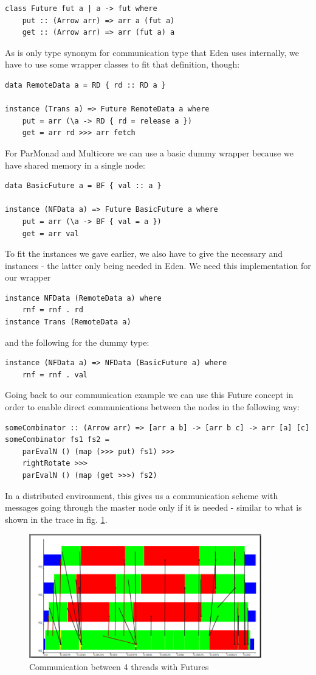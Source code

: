 \begin{lstlisting}[frame=htrbl]
class Future fut a | a -> fut where
    put :: (Arrow arr) => arr a (fut a)
    get :: (Arrow arr) => arr (fut a) a
\end{lstlisting}
As  is only type synonym for communication type that Eden uses internally, we have to use some wrapper classes to fit that definition, though:
\begin{lstlisting}[frame=htrbl]
data RemoteData a = RD { rd :: RD a }

instance (Trans a) => Future RemoteData a where
    put = arr (\a -> RD { rd = release a })
    get = arr rd >>> arr fetch
\end{lstlisting}
For ParMonad and Multicore we can use a basic dummy wrapper because we have shared memory in a single node:
\begin{lstlisting}[frame=htrbl]
data BasicFuture a = BF { val :: a }

instance (NFData a) => Future BasicFuture a where
    put = arr (\a -> BF { val = a })
    get = arr val
\end{lstlisting}
To fit the  instances we gave earlier, we also have to give the necessary  and  instances - the latter only being needed in Eden.
We need this implementation for our  wrapper
\begin{lstlisting}[frame=htrbl]
instance NFData (RemoteData a) where
    rnf = rnf . rd
instance Trans (RemoteData a)
\end{lstlisting}
and the following for the  dummy type:
\begin{lstlisting}[frame=htrbl]
instance (NFData a) => NFData (BasicFuture a) where
	rnf = rnf . val
\end{lstlisting}
Going back to our communication example we can use this Future concept in order to enable direct communications between the nodes in the following way:
\begin{lstlisting}[frame=htrbl]
someCombinator :: (Arrow arr) => [arr a b] -> [arr b c] -> arr [a] [c]
someCombinator fs1 fs2 =
	parEvalN () (map (>>> put) fs1) >>>
	rightRotate >>>
	parEvalN () (map (get >>>) fs2)
\end{lstlisting}
In a distributed environment, this gives us a communication scheme with messages going through the master node only if it is needed - similar to what is shown in the trace in fig. \ref{fig:withFutures}.
\begin{figure}[ht]
	\centering
	\includegraphics[width=0.9\textwidth]{images/withFutures}
	\caption[with Futures]{Communication between 4 threads with Futures}
	\label{fig:withFutures}
\end{figure}